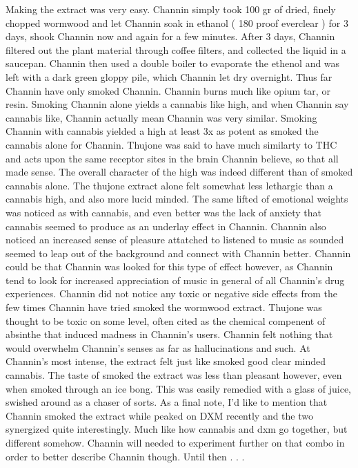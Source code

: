 \documentclass[12pt]{book}
\begin{document}
Making the extract was very easy. Channin simply took 100 gr of dried, finely chopped wormwood and let Channin soak in ethanol ( 180 proof everclear ) for 3 days, shook Channin now and again for a few minutes. After 3 days, Channin filtered out the plant material through coffee filters, and collected the liquid in a saucepan. Channin then used a double boiler to evaporate the ethenol and was left with a dark green gloppy pile, which Channin let dry overnight. Thus far Channin have only smoked Channin. Channin burns much like opium tar, or resin. Smoking Channin alone yields a cannabis like high, and when Channin say cannabis like, Channin actually mean Channin was very similar. Smoking Channin with cannabis yielded a high at least 3x as potent as smoked the cannabis alone for Channin. Thujone was said to have much similarty to THC and acts upon the same receptor sites in the brain Channin believe, so that all made sense. The overall character of the high was indeed different than of smoked cannabis alone. The thujone extract alone felt somewhat less lethargic than a cannabis high, and also more lucid minded. The same lifted of emotional weights was noticed as with cannabis, and even better was the lack of anxiety that cannabis seemed to produce as an underlay effect in Channin. Channin also noticed an increased sense of pleasure attatched to listened to music as sounded seemed to leap out of the background and connect with Channin better. Channin could be that Channin was looked for this type of effect however, as Channin tend to look for increased appreciation of music in general of all Channin's drug experiences. Channin did not notice any toxic or negative side effects from the few times Channin have tried smoked the wormwood extract. Thujone was thought to be toxic on some level, often cited as the chemical compenent of absinthe that induced madness in Channin's users. Channin felt nothing that would overwhelm Channin's senses as far as hallucinations and such. At Channin's most intense, the extract felt just like smoked good clear minded cannabis. The taste of smoked the extract was less than pleasant however, even when smoked through an ice bong. This was easily remedied with a glass of juice, swished around as a chaser of sorts. As a final note, I'd like to mention that Channin smoked the extract while peaked on DXM recently and the two synergized quite interestingly. Much like how cannabis and dxm go together, but different somehow. Channin will needed to experiment further on that combo in order to better describe Channin though. Until then . . . 
\end{document}
